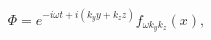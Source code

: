 \begin{equation}
\Phi = e^{ - i \omega t + i (k_y y + k_z z)} f_{\omega k_y k_z}(x),
\end{equation} 
